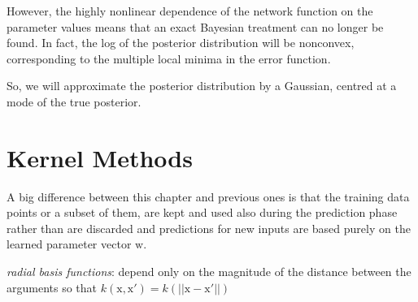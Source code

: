 \documentclass[a4paper]{book}
\begin{document}
However, the highly nonlinear dependence of the network function on the parameter values means
that an exact Bayesian treatment can no longer be found. In fact, the log of the posterior distribution will be nonconvex, corresponding to the multiple local minima in the error function.

So, we will approximate the posterior distribution by a Gaussian, centred at a mode of the true posterior.

\section{Kernel Methods}
A big difference between this chapter and previous ones is that the training data points or a subset of them, are kept and used also during the prediction phase rather than are discarded and predictions for new inputs are based purely on the learned parameter vector $\mathrm w$.

\textit{radial basis functions}: depend only on the magnitude of the distance  between the arguments so that $k(\mathrm x,\mathrm x') = k(||\mathrm x-\mathrm x'||)$
\end{document}
